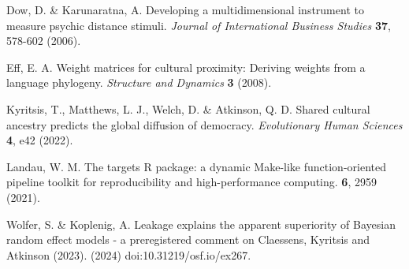 Dow, D. \& Karunaratna, A. Developing a multidimensional instrument to measure 
psychic distance stimuli. \textit{Journal of International Business Studies}
\textbf{37}, 578-602 (2006).

Eff, E. A. Weight matrices for cultural proximity: Deriving weights from a 
language phylogeny. \textit{Structure and Dynamics} \textbf{3} (2008).

Kyritsis, T., Matthews, L. J., Welch, D. \& Atkinson, Q. D. Shared cultural 
ancestry predicts the global diffusion of democracy. \textit{Evolutionary Human 
Sciences} \textbf{4}, e42 (2022).

Landau, W. M. The targets R package: a dynamic Make-like function-oriented
pipeline toolkit for reproducibility and high-performance computing.
 \textbf{6}, 2959 (2021).

Wolfer, S. \& Koplenig, A. Leakage explains the apparent superiority of Bayesian
random effect models - a preregistered comment on Claessens, Kyritsis and 
Atkinson (2023). (2024) doi:10.31219/osf.io/ex267.
